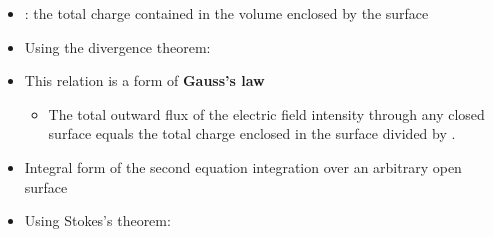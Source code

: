 \begin{ELjoin}

\begin{itemize}
\tightlist
\item
  : the total charge contained in the volume  enclosed by the surface 
\item
  Using the divergence theorem:
\end{itemize}

\begin{ELimportant}{}


\end{ELimportant}

\end{ELjoin}

\begin{ELunit}

\begin{itemize}
\tightlist
\item
  This relation is a form of \textbf{Gauss's law}

  \begin{itemize}
  \tightlist
  \item
    The total outward flux of the electric field intensity through any closed surface equals the total charge enclosed in the surface divided by .
  \end{itemize}
\item
  Integral form of the second equation \ELim{\ELto} integration over an arbitrary open surface 
\end{itemize}


\end{ELunit}

\begin{ELjoin}

\begin{itemize}
\tightlist
\item
  Using Stokes's theorem:
\end{itemize}

\begin{ELimportant}{}


\end{ELimportant}

\end{ELjoin}

